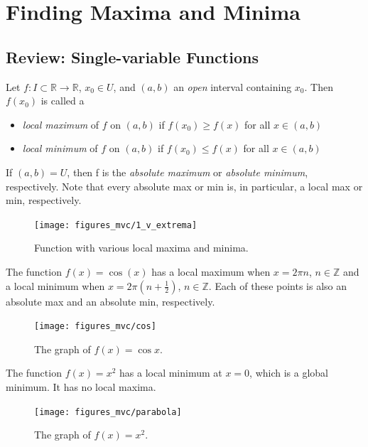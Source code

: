 \documentclass[12pt,letterpaper,reqno]{article}
\numberwithin{equation}{section}
\newcommand{\Z}{\ensuremath{\mathbb Z}}
\newcommand{\fixme}[1]{{\color{orange}{[#1]}}}
\begin{document}
{\section{Finding Maxima and Minima}
\fixme{Infinitesimal to local to global. Example: if $df_p$ zero at every point of $U$ and $U$ connected then $f$ is constant on $U$}

\subsection{Review: Single-variable Functions}
Let $f:I \subset \mathbb{R} \to \mathbb{R}$, $x_0 \in U$, and $(a,b)$ an \emph{open} interval containing $x_0$. Then $f(x_0)$ is called a 
\begin{itemize}
	\item \emph{local maximum} of $f$ on $(a,b)$ if $f(x_0) \geq f(x)$ for all $x \in (a,b)$
	\item \emph{local minimum} of $f$ on $(a,b)$ if $f(x_0) \leq f(x)$ for all $x \in (a,b)$
\end{itemize}
If $(a,b)=U$, then f is the \emph{absolute maximum} or \emph{absolute minimum}, respectively. Note that every absolute max or min is, in particular, a local max or min, respectively.

\begin{figure}[h]
	\begin{center}
\texttt{[image: figures\_mvc/1\_v\_extrema]}
\end{center}
\caption{Function with various local maxima and minima.}
\end{figure}

\begin{example}
The function $f(x)=\cos(x)$ has a local maximum when $x=2\pi n$, $n \in \Z$ and a local minimum when $x=2 \pi(n+\frac{1}{2})$, $n \in \Z$. Each of these points is also an absolute max and an absolute min, respectively.

\begin{figure}[h]
	\begin{center}
	\texttt{[image: figures\_mvc/cos]}
\end{center}
\caption{The graph of $f(x)=\cos x$.}
\end{figure}	
\end{example}

\begin{example}
The function $f(x)=x^2$ has a local minimum at $x=0$, which is a global minimum. It has no local maxima.
\begin{figure}[h]
	\begin{center}
	\texttt{[image: figures\_mvc/parabola]}
\end{center}
\caption{The graph of $f(x)=x^2$.}
\end{figure}	
\end{example}

}
\end{document}
